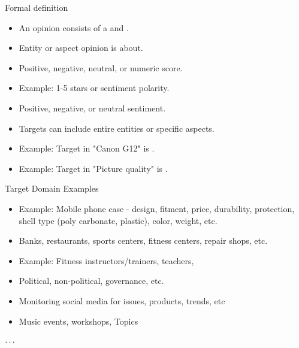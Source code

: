 \begin{frame}{Formal definition}
\begin{itemize}
        \item An opinion consists of a  and .
        \item {} Entity or aspect opinion is about.
        \item {} Positive, negative, neutral, or numeric score.
        \item Example: 1-5 stars or sentiment polarity.
        \item {} Positive, negative, or neutral sentiment.
        \item Targets can include entire entities or specific aspects.
        \item Example: Target in "Canon G12" is .
        \item Example: Target in "Picture quality" is .
    \end{itemize}
\end{frame}
\begin{frame}{Target Domain Examples}
\begin{itemize}
\item Example: Mobile phone case - design, fitment, price, durability, protection,  shell type (poly carbonate, plastic), color, weight, etc.
\end{itemize}

\begin{itemize}
\item Banks, restaurants, sports centers, fitness centers, repair shops, etc.
\end{itemize}

\begin{itemize}
\item Example: Fitness instructors/trainers, teachers,
\end{itemize}

\begin{itemize}
\item Political, non-political, governance, etc.
\end{itemize}
\begin{itemize}
\item Monitoring social media for issues, products, trends, etc
\end{itemize}
\begin{itemize}
\item Music events, workshops, Topics
\end{itemize}


$\Huge \cdots$

\end{frame}


